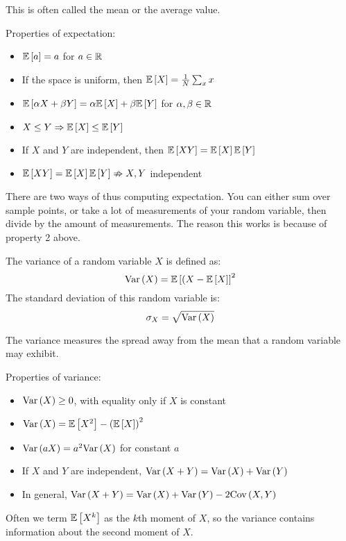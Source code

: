 This is often called the mean or the average value.

\begin{theorem}
    Properties of expectation:
    \begin{itemize}
        \item $\mathbb{E}\left[ a \right] = a$ for $a \in \operatorname{\mathbb{R}}$
        \item If the space is uniform, then $\mathbb{E}\left[ X \right] = \frac{1}{N} \sum_{x} x$
        \item $\mathbb{E}\left[ \alpha X + \beta Y \right] = \alpha \mathbb{E}\left[ X \right] + \beta \mathbb{E}\left[ Y \right]$ for $\alpha, \beta \in \operatorname{\mathbb{R}}$
        \item $X \leq Y \Rightarrow \mathbb{E}\left[ X \right] \leq \mathbb{E}\left[ Y \right]$
        \item If $X$ and $Y$ are independent, then $\mathbb{E}\left[ XY \right] = \mathbb{E}\left[ X \right] \mathbb{E}\left[ Y \right]$
        \item $\mathbb{E}\left[ XY \right] = \mathbb{E}\left[ X \right] \mathbb{E}\left[ Y \right] \nRightarrow X, Y$ independent
    \end{itemize}
\end{theorem}

There are two ways of thus computing expectation. You can either sum over sample points, or take
a lot of measurements of your random variable, then divide by the amount of measurements. The reason this works is
because of property 2 above.

\begin{definition} 
    The variance of a random variable $X$ is defined as:
    \[ \text{Var}\left( X \right) = \mathbb{E}\left[ (X - \mathbb{E}\left[ X \right] \right]^2 \]
    The standard deviation of this random variable is:
    \[ \sigma_X = \sqrt{\text{Var}\left( X \right)} \]
\end{definition}

The variance measures the spread away from the mean that a random variable may exhibit.

\begin{theorem}
    Properties of variance:
    \begin{itemize}
        \item $\text{Var}\left( X \right) \geq 0$, with equality only if $X$ is constant
        \item $\text{Var}\left( X \right) = \mathbb{E}\left[ X^2 \right] - \qty(\mathbb{E}\left[ X \right])^2$
        \item $\text{Var}\left( aX \right) = a^2 \text{Var}\left( X \right)$ for constant $a$
        \item If $X$ and $Y$ are independent, $\text{Var}\left( X + Y \right) = \text{Var}\left( X \right) + \text{Var}\left( Y \right)$
        \item In general, $\text{Var}\left( X + Y \right) = \text{Var}\left( X \right) + \text{Var}\left( Y \right) - 2 \text{Cov}\left( X, Y \right)$
    \end{itemize}
\end{theorem}

Often we term $\mathbb{E}\left[ X^k \right]$ as the $k$th moment of $X$, so the variance contains information
about the second moment of $X$.